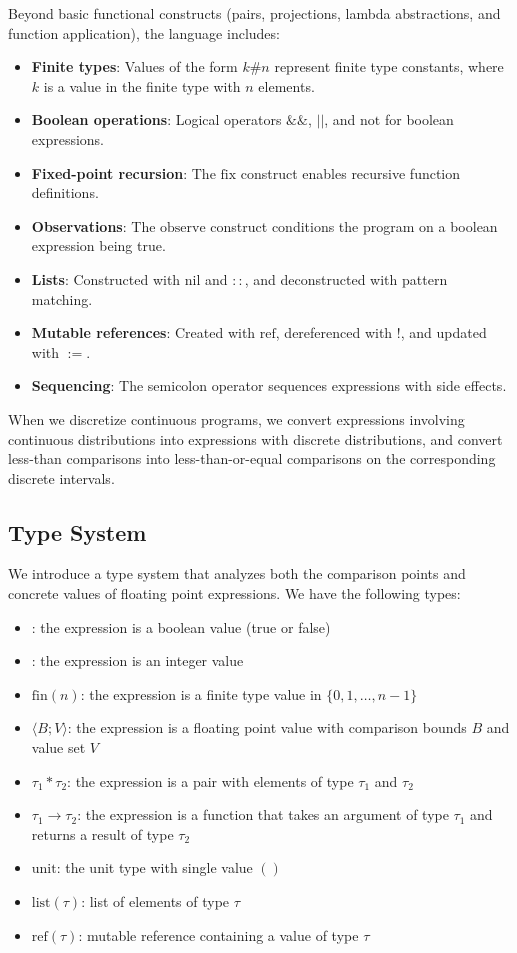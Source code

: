 \documentclass[acmsmall,screen,dvipsnames,x11names,nonacm,anonymous,review]{acmart}
\begin{document}
Beyond basic functional constructs (pairs, projections, lambda abstractions, and function application), the language includes:
\begin{itemize}
\item \textbf{Finite types}: Values of the form $k\#n$ represent finite type constants, where $k$ is a value in the finite type with $n$ elements.
\item \textbf{Boolean operations}: Logical operators $\&\&$, $||$, and $\text{not}$ for boolean expressions.
\item \textbf{Fixed-point recursion}: The $\text{fix}$ construct enables recursive function definitions.
\item \textbf{Observations}: The $\text{observe}$ construct conditions the program on a boolean expression being true.
\item \textbf{Lists}: Constructed with $\text{nil}$ and $::$, and deconstructed with pattern matching.
\item \textbf{Mutable references}: Created with $\text{ref}$, dereferenced with $!$, and updated with $:=$.
\item \textbf{Sequencing}: The semicolon operator sequences expressions with side effects.
\end{itemize}

When we discretize continuous programs, we convert expressions involving continuous distributions into expressions with discrete distributions, and convert less-than comparisons into less-than-or-equal comparisons on the corresponding discrete intervals.

\subsection{Type System}\label{sec:type-system}

We introduce a type system that analyzes both the comparison points and concrete values of floating point expressions. We have the following types:
\begin{itemize}
    \item \bool: the expression is a boolean value (true or false)
    \item \intty: the expression is an integer value  
    \item $\text{fin}(n)$: the expression is a finite type value in $\{0, 1, \ldots, n-1\}$
    \item \float$\langle B; V \rangle$: the expression is a floating point value with comparison bounds $B$ and value set $V$
    \item $\tau_1 * \tau_2$: the expression is a pair with elements of type $\tau_1$ and $\tau_2$
    \item $\tau_1 \rightarrow \tau_2$: the expression is a function that takes an argument of type $\tau_1$ and returns a result of type $\tau_2$
    \item $\text{unit}$: the unit type with single value $()$
    \item $\text{list}(\tau)$: list of elements of type $\tau$
    \item $\text{ref}(\tau)$: mutable reference containing a value of type $\tau$
\end{itemize}
\end{document}
